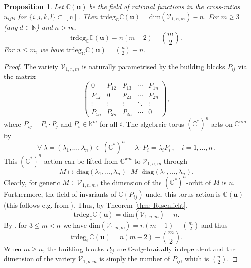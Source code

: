 \documentclass[12pt,a4paper]{extarticle}
\newtheorem{proposition}[theorem]{Proposition}
\theoremstyle{definition}
\begin{document}
\begin{proposition} \label{prop:cu}
Let $\mathbb{C}(\mathbf{u})$ be the field of rational functions in the cross-ratios $u_{ijkl}$ for $\{i,j,k,l\}\subset [n]$. 
Then $\mathrm{trdeg}_{\mathbb{C}}\mathbb{C}(\mathbf{u})=\mathrm{dim}(\mathcal{V}_{1,n,m})-n$. For $m\ge 3$ (any $d\in\mathbb{N}$) and $n>m$,
\begin{equation}
    \mathrm{trdeg}_{\mathbb{C}}\mathbb{C}(\mathbf{u})=n(m-2)+\binom{m}{2}\,.
\end{equation}
For $n\leq m$, we have $\mathrm{trdeg}_{\mathbb{C}}\mathbb{C}(\mathbf{u})=\binom{n}{2}-n$.
\end{proposition}
\begin{proof}
 The variety $\mathcal{V}_{1,n,m}$ is naturally parametrised by the building blocks $P_{ij}$ via the matrix
    \begin{equation}
        \begin{pmatrix}
            0&P_{12}&P_{13}&\cdots&P_{1n}\\P_{12}&0&P_{23}&\cdots&P_{2n}\\\vdots&\vdots&\vdots&\ddots&\vdots\\P_{1n}&P_{2n}&P_{3n}&\cdots&0
        \end{pmatrix},
    \end{equation}
    where $P_{ij}=P_i\cdot P_j$ and $P_i\in\mathbb{K}^m$ for all $i$. 
    The algebraic torus $(\mathbb{C}^*)^n$ acts on $\mathbb{C}^{nm}$ by
    \begin{equation}
        \forall \ \lambda=(\lambda_1,\ldots,\lambda_n)\in (\mathbb{C}^*)^n: \quad \lambda\cdot P_i=\lambda_i P_i\,, \quad i=1,\ldots,n\,.
    \end{equation}
    This $(\mathbb{C}^*)^n$-action can be lifted from $\mathbb{C}^{nm}$ to $\mathcal{V}_{1,n,m}$ through
    \begin{equation}
        M\mapsto\mathrm{diag}(\lambda_1,\ldots,\lambda_n)\cdot M\cdot\mathrm{diag}(\lambda_1,\ldots,\lambda_n).
    \end{equation}
    Clearly, for generic $M\in\mathcal{V}_{1,n,m}$, the dimension of the $(\mathbb{C}^*)^n$-orbit of $M$ is $n$. 
    Furthermore, the field of invariants of $\mathbb{C}(P_{ij})$ under this torus action is $\mathbb{C}(\mathbf{u})$ (this follows e.g. from \cite[Section 1.4]{sturmfelsInvTh}).
    Thus, by Theorem \ref{thm: Rosenlicht},
    \begin{equation}
        \mathrm{trdeg}_{\mathbb{C}}\mathbb{C}(\mathbf{u})=\mathrm{dim}(\mathcal{V}_{1,n,m})-n.
    \end{equation}
    By \cite[Theorem 2.5]{MSS}, for $3\leq m<n$ we have $\mathrm{dim}(\mathcal{V}_{1,n,m})=n(m-1)-\binom{m}{2}$ and thus
    \begin{equation}
        \mathrm{trdeg}_{\mathbb{C}}\mathbb{C}(\mathbf{u})=n(m-2)-\binom{m}{2}.
    \end{equation}
    When $m\geq n$, the building blocks $P_{ij}$ are $\mathbb{C}$-algebraically independent and the dimension of the variety $\mathcal{V}_{1,n,m}$ is simply the number of $P_{ij}$, which is $\binom{n}{2}$. 
\end{proof}
\end{document}
